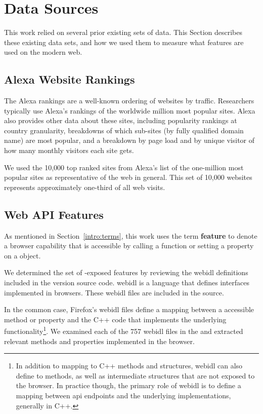 \section{Data Sources}
\label{measurement:data-sources}

This work relied on several prior existing sets of data.  This Section
describes these existing data sets, and how we used them to measure what
\JS features are used on the modern web.


\subsection{Alexa Website Rankings}
\label{measurement:data-sources:website-popularity-rankings}
The Alexa rankings are a well-known ordering of websites by traffic.
Researchers typically use Alexa's rankings of the worldwide million most
popular sites. Alexa also provides other data about these sites,
including popularity rankings at country granularity, breakdowns of which
sub-sites (by fully qualified domain name) are most popular, and a breakdown by
page load and by unique visitor of how many monthly visitors each site gets.

We used the 10,000 top ranked sites from Alexa's list of the one-million
most popular sites as representative of the web in general.  This set of 10,000
websites represents approximately one-third of all web visits.


\subsection{Web API Features}
\label{measurement:data-sources:method-web-features}
As mentioned in Section~\ref{intro:terms}, this work uses the term
\textbf{feature} to denote a browser capability that is accessible by
calling a \JS function or setting a property on a \JS object.

We determined the set of \JS-exposed features by reviewing the \gls{webidl}
definitions included in the \FF version \FFversion source code. \gls{webidl} is
a language that defines \JS interfaces implemented in browsers.
These \gls{webidl} files are included in the \FF source.

In the common case, Firefox's \gls{webidl} files define a mapping between a
\JS accessible method or property and the C++ code that implements
the underlying functionality\footnote{In addition to mapping
\JS to C++ methods and structures, \gls{webidl} can also define \JS
to \JS methods, as well as intermediate structures that are not
exposed to the browser.  In practice though, the primary role of \gls{webidl}
is to define a mapping between \JS \gls{api} endpoints and
the underlying implementations, generally in C++.}. We examined each of the 757
\gls{webidl} files in the \FF and extracted \numfeatures relevant methods and
properties implemented in the browser.


